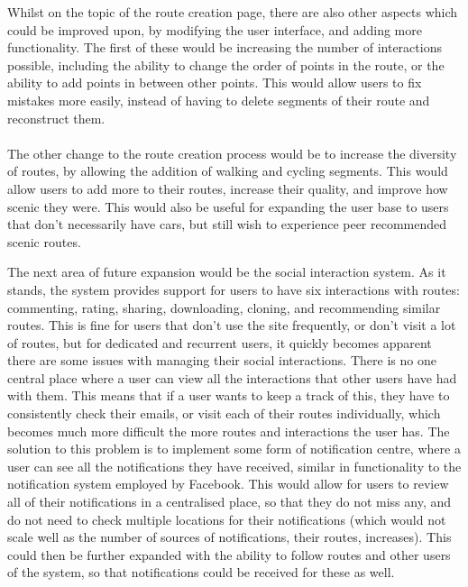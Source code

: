 \noindent 
Whilst on the topic of the route creation page, there are also other aspects which could be improved upon, by modifying the user interface, and adding more functionality. The first of these would be increasing the number of interactions possible, including the ability to change the order of points in the route, or the ability to add points in between other points. This would allow users to fix mistakes more easily, instead of having to delete segments of their route and reconstruct them. 
\ \\
\ \\
The other change to the route creation process would be to increase the diversity of routes, by allowing the addition of walking and cycling segments. This would allow users to add more to their routes, increase their quality, and improve how scenic they were. This would also be useful for expanding the user base to users that don't necessarily have cars, but still wish to experience peer recommended scenic routes.

\newpage 
\noindent 
The next area of future expansion would be the social interaction system. As it stands, the system provides support for users to have six interactions with routes: commenting, rating, sharing, downloading, cloning, and recommending similar routes. This is fine for users that don't use the site frequently, or don't visit a lot of routes, but for dedicated and recurrent users, it quickly becomes apparent there are some issues with managing their social interactions. There is no one central place where a user can view all the interactions that other users have had with them. This means that if a user wants to keep a track of this, they have to consistently check their emails, or visit each of their routes individually, which becomes much more difficult the more routes and interactions the user has. The solution to this problem is to implement some form of notification centre, where a user can see all the notifications they have received, similar in functionality to the notification system employed by Facebook. This would allow for users to review all of their notifications in a centralised place, so that they do not miss any, and do not need to check multiple locations for their notifications (which would not scale well as the number of sources of notifications, their routes, increases). This could then be further expanded with the ability to follow routes and other users of the system, so that notifications could be received for these as well.


